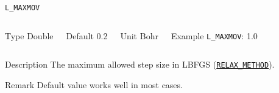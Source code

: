 \documentclass[xcolor=dvipsnames,t]{beamer}
\begin{document}
\begin{frame}[allowframebreaks]{\texttt{L\_MAXMOV}} \label{L_MAXMOV}
\vspace*{-12pt}
\begin{columns}
\begin{block}{Type}
Double
\end{block}

\begin{block}{Default}
0.2
\end{block}

\begin{block}{Unit}
Bohr
\end{block}

\begin{block}{Example}
\texttt{L\_MAXMOV}: 1.0
\end{block}
\end{columns}

\begin{block}{Description}
The maximum allowed step size in LBFGS (\hyperlink{RELAX_METHOD}{\texttt{RELAX\_METHOD}}).
\end{block}

\begin{block}{Remark}
Default value works well in most cases.
\end{block}

\end{frame}
\end{document}

